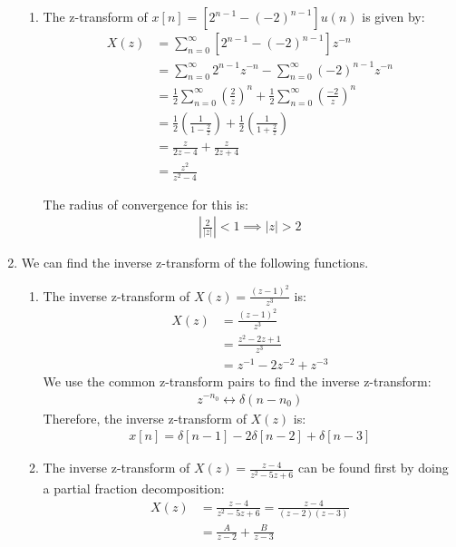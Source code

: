 \documentclass{article}
\begin{document}
\begin{enumerate}[label=P1.\arabic*]
\begin{enumerate}
        \item The z-transform of $x[n] = \left[2^{n-1} - (-2)^{n-1}\right]u(n)$ is given by:
        \begin{align*}
            X(z) &= \sum_{n=0}^{\infty} \left[2^{n-1} - (-2)^{n-1}\right]z^{-n} \\
            &= \sum_{n=0}^{\infty} 2^{n-1}z^{-n} - \sum_{n=0}^{\infty} (-2)^{n-1}z^{-n} \\
            &= \frac{1}{2}\sum_{n=0}^{\infty} \left(\frac{2}{z}\right)^n + \frac{1}{2}\sum_{n=0}^{\infty} \left(\frac{-2}{z}\right)^n \\
            &= \frac{1}{2}\left(\frac{1}{1 - \frac{2}{z}}\right) + \frac{1}{2}\left(\frac{1}{1 + \frac{2}{z}}\right) \\
            &= \frac{z}{2z - 4} + \frac{z}{2z + 4} \\
            &= \frac{z^2}{z^2 - 4}
        \end{align*}

        The radius of convergence for this is:
        \begin{align*}
            \left|\frac{2}{\left|z\right|}\right| < 1 \implies \left|z\right| > 2
        \end{align*}
    \end{enumerate}

    \item We can find the inverse z-transform of the following functions.
    \begin{enumerate}
        \item The inverse z-transform of $X(z) = \frac{(z-1)^2}{z^3}$ is:   
        \begin{align*}
            X(z) &= \frac{(z-1)^2}{z^3} \\
            &= \frac{z^2 - 2z + 1}{z^3} \\
            &= z^{-1} - 2z^{-2} + z^{-3}
        \end{align*}
        We use the common z-transform pairs to find the inverse z-transform:
        \begin{align*}
            z^{-n_0} \longleftrightarrow \delta(n-n_0)
        \end{align*}
        Therefore, the inverse z-transform of $X(z)$ is:
        \begin{align*}
            x[n] = \delta[n-1] - 2\delta[n-2] + \delta[n-3]
        \end{align*}
        
        \item The inverse z-transform of $X(z) = \frac{z-4}{z^2-5z+6}$ can be found first by doing a partial fraction decomposition:
        \begin{align*}
            X(z) &= \frac{z-4}{z^2-5z+6} = \frac{z-4}{(z-2)(z-3)} \\
            &= \frac{A}{z-2} + \frac{B}{z-3} \\
        \end{align*}


\end{enumerate}
\end{enumerate}
\end{document}
